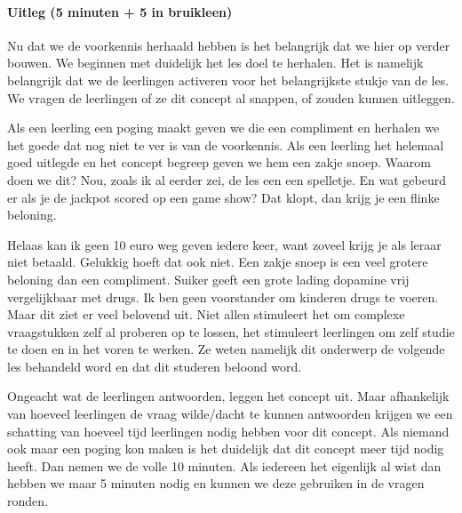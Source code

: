                 \paragraph{Uitleg (5 minuten + 5 in bruikleen)}
                    Nu dat we de voorkennis herhaald hebben is het belangrijk dat we hier op verder bouwen. We beginnen met duidelijk het les doel te herhalen. Het is namelijk belangrijk dat we de leerlingen activeren voor het belangrijkste stukje van de les. We vragen de leerlingen of ze dit concept al snappen, of zouden kunnen uitleggen. 

                    \bigskip
                    
                    \noindent Als een leerling een poging maakt geven we die een compliment en herhalen we het goede dat nog niet te ver is van de voorkennis. Als een leerling het helemaal goed uitlegde en het concept begreep geven we hem een zakje snoep. Waarom doen we dit? Nou, zoals ik al eerder zei, de les een een spelletje. En wat gebeurd er als je de jackpot scored op een game show? Dat klopt, dan krijg je een flinke beloning. 
                    
                    \bigskip
                    
                    \noindent Helaas kan ik geen 10 euro weg geven iedere keer, want zoveel krijg je als leraar niet betaald. Gelukkig hoeft dat ook niet. Een zakje snoep is een veel grotere beloning dan een compliment. Suiker geeft een grote lading dopamine vrij vergelijkbaar met drugs.\cite{sugar-equals-drugs} Ik ben geen voorstander om kinderen drugs te voeren. Maar dit ziet er veel belovend uit. Niet allen stimuleert het om complexe vraagstukken zelf al proberen op te lossen, het stimuleert leerlingen om zelf studie te doen en in het voren te werken. Ze weten namelijk dit onderwerp de volgende les behandeld word en dat dit studeren beloond word. 
                    
                    \bigskip
                    
                    \noindent Ongeacht wat de leerlingen antwoorden, leggen het concept uit. Maar afhankelijk van hoeveel leerlingen de vraag wilde/dacht te kunnen antwoorden krijgen we een schatting van hoeveel tijd leerlingen nodig hebben voor dit concept. Als niemand ook maar een poging kon maken is het duidelijk dat dit concept meer tijd nodig heeft. Dan nemen we de volle 10 minuten. Als iedereen het eigenlijk al wist dan hebben we maar 5 minuten nodig en kunnen we deze gebruiken in de vragen ronden. 
                    
